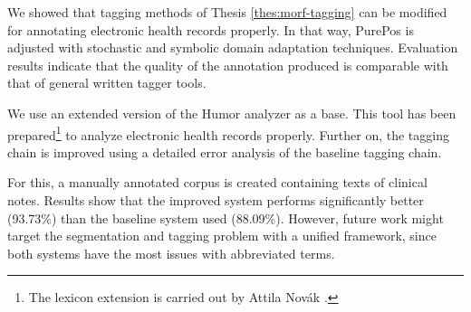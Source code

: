 \thesisline%

\begin{core}
\begin{thesis}%
\label{thes:clin-pos}
We showed that tagging methods of Thesis \ref{thes:morf-tagging} can be modified for annotating electronic health records properly.
In that way, PurePos is adjusted with stochastic and symbolic domain adaptation techniques.
Evaluation results indicate that the quality of the annotation produced is comparable with that of general written tagger tools.
\end{thesis}

\begin{pub}
\cite{Orosz2013,Orosz2014b} 
\end{pub}
\end{core}

We use an extended version of the Humor analyzer as a base. 
This tool has been prepared\footnote{The lexicon extension is carried out by Attila Novák \cite{Orosz2014} .} to analyze electronic health records properly.
Further on, the tagging chain is improved using a detailed error analysis of the baseline tagging chain.

For this, a manually annotated corpus is created containing texts of clinical notes.
Results show that the improved system performs significantly better (93.73\%) than the baseline system used (88.09\%).
However, future work might target the segmentation and tagging problem with a unified framework, since both systems have the most issues with abbreviated terms.

\let\thesubsection=\oldthesubsection